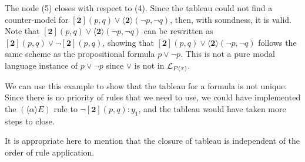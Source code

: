 \begin{example}
    \par The node (5) closes with respect to (4). Since the tableau could not find a counter-model for $[\textbf{2}](p,q) \vee \langle\textbf{2}\rangle(\neg p, \neg q)$, then, with soundness, it is valid. Note that $[\textbf{2}](p,q) \vee \langle\textbf{2}\rangle(\neg p, \neg q)$ can be rewritten as $[\textbf{2}](p,q) \vee \neg [\textbf{2}](p, q)$, showing that $[\textbf{2}](p,q) \vee \langle\textbf{2}\rangle(\neg p, \neg q)$ follows the same scheme as the propositional formula $p \vee \neg p$. This is not a pure modal language instance of $p \vee \neg p$ since $\vee$ is not in $\mathcal{L}_{P(\tau)}$.
    \par We can use this example to show that the tableau for a formula is not unique. Since there is no priority of rules that we need to use, we could have implemented the $(\langle\alpha\rangle E)$ rule to $\neg[\textbf{2}](p,q):y_1$, and the tableau would have taken more steps to close.
\end{example}

\begin{remark}
    It is appropriate here to mention that the closure of tableau is independent of the order of rule application.
\end{remark}

